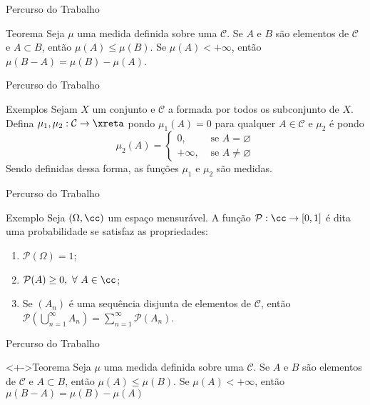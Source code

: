 	\begin{frame}{Percurso do Trabalho}
		\begin{block}{Teorema}
			\justify Seja $\mu$ uma medida definida sobre uma \sigal $\mathcal{C}$.
			Se $A$ e $B$ são elementos de $\mathcal{C}$ e $A \subset B$, então $\mu(A) \leq \mu(B)$.
			Se $\mu(A) < +\infty$, então $\mu(B-A) = \mu(B) - \mu(A)$.
		\end{block}
	\end{frame}

	\begin{frame}{Percurso do Trabalho}
		\begin{block}{Exemplos}
			Sejam $X$ um conjunto e $\mathcal{C}$ a \sigal formada por todos os subconjunto de $X$.    
			Defina $\mu_1, \mu_2:\mathcal{C} \to \xreta$ pondo $\mu_1(A) = 0$ para qualquer  $A \in \mathcal{C}$ e 
			$\mu_2$ é  pondo 
			$$\mu_2(A) = \left\{\begin{array}{cc}
				0, & \textrm{\ se \ } A = \varnothing \\
				+\infty,& \textrm{\ se \ } A \neq \varnothing
			\end{array}\right.$$
			Sendo definidas dessa forma, as funções $\mu_1$ e $\mu_2$ são medidas.
		\end{block}
	\end{frame}

	\begin{frame}{Percurso do Trabalho}
		\begin{block}{Exemplo}
			\justify Seja $(\Omega, \cc)$ um espaço mensurável.
			A função $\mathcal{P}:\cc \to [0,1]$ é dita uma probabilidade se satisfaz as propriedades:
			\begin{enumerate}[<+->]
				\item $\mathcal{P}(\Omega) = 1$;
				\item $\mathcal{P}(A) \geq 0,\ \forall\  A \in \cc$;
				\item Se $(A_n)$ é uma sequência disjunta de elementos de  $\mathcal{C}$, então 
				$\displaystyle\mathcal{P}\left(\bigcup_{n = 1}^\infty A_n\right) = \sum_{n = 1}^\infty\mathcal{P}(A_n)$.
			\end{enumerate}
		\end{block}
	\end{frame}
	\begin{frame}{Percurso do Trabalho}
		\begin{block}<+->{Teorema}
			\justify Seja $\mu$ uma medida definida sobre uma \sigal $\mathcal{C}$.
			Se $A$ e $B$ são elementos de $\mathcal{C}$ e $A \subset B$, então $\mu(A) \leq \mu(B)$.
			Se $\mu(A) < +\infty$, então $\mu(B-A) = \mu(B) - \mu(A)$
		\end{block}
	\end{frame}


